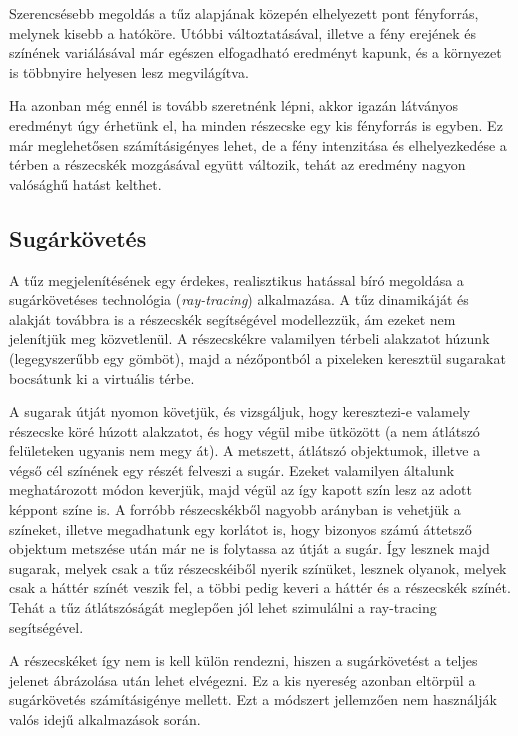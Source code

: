 Szerencsésebb megoldás a tűz alapjának közepén elhelyezett pont fényforrás, melynek kisebb a hatóköre. Utóbbi változtatásával, illetve a fény erejének és színének variálásával már egészen elfogadható eredményt kapunk, és a környezet is többnyire helyesen lesz megvilágítva.

Ha azonban még ennél is tovább szeretnénk lépni, akkor igazán látványos eredményt úgy érhetünk el, ha minden részecske egy kis fényforrás is egyben. Ez már meglehetősen számításigényes lehet, de a fény intenzitása és elhelyezkedése a térben a részecskék mozgásával együtt változik, tehát az eredmény nagyon valósághű hatást kelthet.

\subsection{Sugárkövetés}
A tűz megjelenítésének egy érdekes, realisztikus hatással bíró megoldása a sugárkövetéses technológia (\textit{ray-tracing}) alkalmazása. A tűz dinamikáját és alakját továbbra is a részecskék segítségével modellezzük, ám ezeket nem jelenítjük meg közvetlenül. A részecskékre valamilyen térbeli alakzatot húzunk (legegyszerűbb egy gömböt), majd a nézőpontból a pixeleken keresztül sugarakat bocsátunk ki a virtuális térbe. 

A sugarak útját nyomon követjük, és vizsgáljuk, hogy keresztezi-e valamely részecske köré húzott alakzatot, és hogy végül mibe ütközött (a nem átlátszó felületeken ugyanis nem megy át). A metszett, átlátszó objektumok, illetve a végső cél színének egy részét felveszi a sugár. Ezeket valamilyen általunk meghatározott módon keverjük, majd végül az így kapott szín lesz az adott képpont színe is. A forróbb részecskékből nagyobb arányban is vehetjük a színeket, illetve megadhatunk egy korlátot is, hogy bizonyos számú áttetsző objektum metszése után már ne is folytassa az útját a sugár. Így lesznek majd sugarak, melyek csak a tűz részecskéiből nyerik színüket, lesznek olyanok, melyek csak a háttér színét veszik fel, a többi pedig keveri a háttér és a részecskék színét. Tehát a tűz átlátszóságát meglepően jól lehet szimulálni a ray-tracing segítségével. 

A részecskéket így nem is kell külön rendezni, hiszen a sugárkövetést a teljes jelenet ábrázolása után lehet elvégezni. Ez a kis nyereség azonban eltörpül a sugárkövetés számításigénye mellett. Ezt a módszert jellemzően nem használják valós idejű alkalmazások során.

















